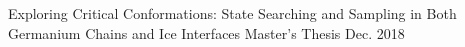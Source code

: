 

\begin{cventries}

  \cventry
    {} %
    {Exploring Critical Conformations: State Searching and Sampling in Both Germanium Chains and Ice Interfaces} %
    {Master's Thesis} %
    {Dec. 2018} %
    {
      \begin{cvitems} %
      \end{cvitems}
    }

\end{cventries}
